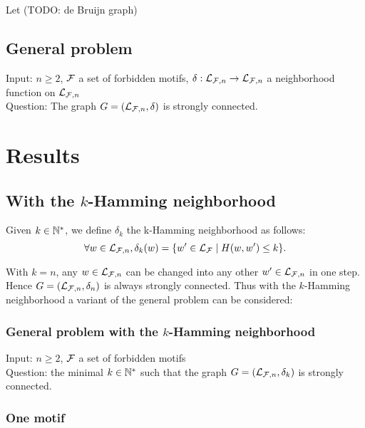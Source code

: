 \documentclass{article}
\begin{document}
\noindent
Let (TODO: de Bruijn graph)

\subsection*{General problem}

Input: $n \geq 2$, $\mathcal{F}$ a set of forbidden motifs, $\delta: \mathcal{L}_{\mathcal{F}, n} \rightarrow \mathcal{L}_{\mathcal{F}, n}$ a neighborhood function on $\mathcal{L}_{\mathcal{F}, n}$ \\
Question: The graph $G = (\mathcal{L}_{\mathcal{F}, n}, \delta)$ is strongly connected.

\section{Results}

\subsection{With the $k$-Hamming neighborhood}
\begin{definition}
	Given $k \in \mathbb{N}^*$, we define $\delta_k$ the k-Hamming neighborhood as follows:
	$$\forall w \in \mathcal{L}_{\mathcal{F}, n},  \delta_k(w) = \{w'\in \mathcal{L}_{\mathcal{F}} \mid H(w,w')\le k\}. $$
\end{definition}

With $k = n$, any $w \in \mathcal{L}_{\mathcal{F}, n}$ can be changed into any other $w' \in \mathcal{L}_{\mathcal{F}, n}$ in one step. Hence $G = (\mathcal{L}_{\mathcal{F}, n}, \delta_n)$ is always strongly connected. Thus with the $k$-Hamming neighborhood a variant of the general problem can be considered:

\subsubsection*{General problem with the $k$-Hamming neighborhood}

Input: $n \geq 2$, $\mathcal{F}$ a set of forbidden motifs \\
Question: the minimal $k \in \mathbb{N}^*$ such that the graph $G = (\mathcal{L}_{\mathcal{F}, n}, \delta_k)$ is strongly connected.


\subsubsection{One motif}
\end{document}

